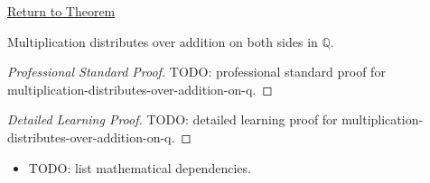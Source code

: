 \newpage
{}
\label{prf:multiplication-distributes-over-addition-on-q}

\begin{remark*}[Return]
\hyperref[thm:multiplication-distributes-over-addition-on-q]{Return to Theorem}
\end{remark*}

\begin{theorem*}
Multiplication distributes over addition on both sides in $\mathbb{Q}$.
\end{theorem*}

\begin{proof}[Professional Standard Proof]
\LRAProofBodyStart
TODO: professional standard proof for multiplication-distributes-over-addition-on-q.
\end{proof}

\begin{proof}[Detailed Learning Proof]
\LRAProofBodyStart
TODO: detailed learning proof for multiplication-distributes-over-addition-on-q.
\end{proof}

\begin{remark*}
\end{remark*}

\begin{dependencies}
\begin{itemize}
  \item TODO: list mathematical dependencies.
\end{itemize}
\end{dependencies}

\clearpage
